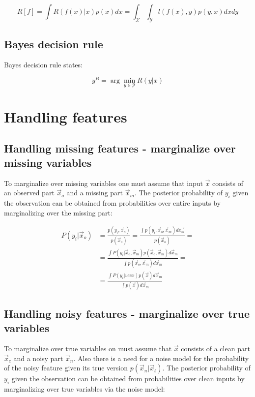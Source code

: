		$$R[f] = \int R(f(x)|x)p(x)dx = \int_\mathcal{X}\int_\mathcal{Y}l(f(x), y)p(y, x)dxdy$$

	\subsection{Bayes decision rule}
	Bayes decision rule states:

	$$y^B = \arg\min\limits_{y\in\mathcal{Y}} R(y|x)$$

\section{Handling features}

	\subsection{Handling missing features - marginalize over missing variables}
	To marginalize over missing variables one must assume that input $\vec{x}$ consists of an observed part $\vec{x}_o$ and a missing part $\vec{x}_m$.
	The posterior probability of $y_i$ given the observation can be obtained from probabilities over entire inputs by marginalizing over the missing part:

	\begin{align*}
		P(y_i|\vec{x}_o) &= \frac{p(y_i, \vec{x}_o)}{p(\vec{x}_o)} = \frac{\int p(y_i, \vec{x}_o, \vec{x}_m)d\vec{x_m}}{p(\vec{x}_o)}=\\
										 &= \frac{\int P(y_i|\vec{x}_o, \vec{x}_m)p(\vec{x}_o, \vec{x}_m)d\vec{x}_m}{\int p(\vec{x}_o, \vec{x}_m)d\vec{x}_m}=\\
										 &= \frac{\int P(y_i|vec{x})p(\vec{x})d\vec{x}_m}{\int p(\vec{x})d\vec{x}_m}
	\end{align*}

	\subsection{Handling noisy features - marginalize over true variables}
	To marginalize over true variables on must assume that $\vec{x}$ consists of a clean part $\vec{x}_c$ and a noisy part $\vec{x}_n$.
	Also there is a need for a noise model for the probability of the noisy feature given its true version $p(\vec{x}_n|\vec{x}_t)$.
	The posterior probability of $y_i$ given the observation can be obtained from probabilities over clean inputs by marginalizing over true variables via the noise model:

